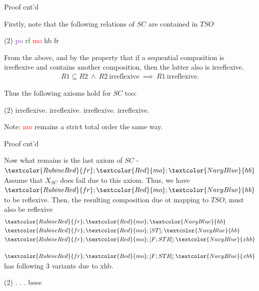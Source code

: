 \documentclass[xcolor={dvipsnames}, notes]{beamer}
\newcommand{\po}{\textcolor{BlueViolet}{po}}
\newcommand{\rf}{\textcolor{Green}{rf}}
\newcommand{\mo}{\textcolor{Red}{mo}}
\newcommand{\hb}{\textcolor{NavyBlue}{hb}}
\newcommand{\fr}{\textcolor{RubineRed}{fr}}
\newcommand{\xhb}{\textcolor{NavyBlue}{xhb}}
\newcommand{\rfe}{\textcolor{Green}{rfe}}
\newcommand{\rfi}{\textcolor{Green}{rfi}}
\begin{document}
    \begin{frame}{Proof cnt'd}

        Firstly, note that the following relations of $SC$ are contained in $TSO$
        \begin{tasks}(2)
            \task \po
            \task \rf
            \task \mo
            \task \hb
            \task \fr
        \end{tasks}

        From the above, and by the property that if a sequential composition is irreflexive and contains another composition, then the latter also is irreflexive.
        \begin{align*}
            R1 \subseteq R2 \ \wedge \ R2 \ \text{irreflexive} \ \implies \ R1 \ \text{irreflexive}.
        \end{align*}
        
        Thus the following axioms hold for $SC$ too:
        \begin{tasks}(2)
            \task {\hb} irreflexive.
            \task {\mo;\hb} irreflexive.
            \task {\fr;\hb} irreflexive.
            \task {\fr;\mo} irreflexive.
        \end{tasks}

        Note: {\mo} remains a strict total order the same way.

    \end{frame}

    \begin{frame}{Proof cnt'd}
        
        Now what remains is the last axiom of $SC$ - ${\fr;\mo;\hb}$
        Assume that $X_{SC}$ does fail due to this axiom.
        Thus, we have ${\fr;\mo;\hb}$ to be reflexive. 
        Then, the resulting composition due ot mapping to $TSO$, must also be reflexive 
        \begin{align*}
            &{\fr;\mo;\hb} \\
            &{\fr;\mo;[ST];\hb} \\
            &{\fr;\mo;[F;STR];\xhb}  
        \end{align*}

        $\fr;\mo;[F;STR];\xhb$ has following 3 variants due to {\xhb}.
        \begin{tasks}(2)
            \task {\fr;\mo;[F];\po}.
            \task {\fr;\mo;\rfe;\po}.
            \task {\fr;\mo;\rfi;\po}.
            \task beee
        \end{tasks}
        
    \end{frame}
\end{document}
